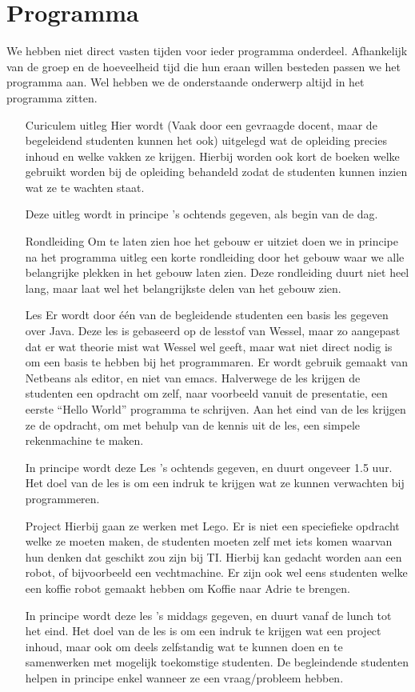 \documentclass[a4paper,11pt]{report}
\begin{document}
\chapter{Programma}
We hebben niet direct vasten tijden voor ieder programma onderdeel. Afhankelijk van de groep en de hoeveelheid tijd die hun eraan willen besteden passen we het programma aan. Wel hebben we de onderstaande onderwerp altijd in het programma zitten.
\begin{itemize}
  \item[Curiculem uitleg] Hier wordt (Vaak door een gevraagde docent, maar de begeleidend studenten kunnen het ook) uitgelegd wat de opleiding precies inhoud en welke vakken ze krijgen. Hierbij worden ook kort de boeken welke gebruikt worden bij de opleiding behandeld zodat de studenten kunnen inzien wat ze te wachten staat. 

    Deze uitleg wordt in principe 's ochtends gegeven, als begin van de dag. 
  \item[Rondleiding] Om te laten zien hoe het gebouw er uitziet doen we in principe na het programma uitleg een korte rondleiding door het gebouw waar we alle belangrijke plekken in het gebouw laten zien. Deze rondleiding duurt niet heel lang, maar laat wel het belangrijkste delen van het gebouw zien.
  \item[Les] Er wordt door \'{e}\'{e}n van de begleidende studenten een basis les gegeven over Java. Deze les is gebaseerd op de lesstof van Wessel, maar zo aangepast dat er wat theorie mist wat Wessel wel geeft, maar wat niet direct nodig is om een basis te hebben bij het programmaren. Er wordt gebruik gemaakt van Netbeans als editor, en niet van emacs. Halverwege de les krijgen de studenten een opdracht om zelf, naar voorbeeld vanuit de presentatie, een eerste ``Hello World'' programma te schrijven. Aan het eind van de les krijgen ze de opdracht, om met behulp van de kennis uit de les, een simpele rekenmachine te maken. 

    In principe wordt deze Les 's ochtends gegeven, en duurt ongeveer 1.5 uur. Het doel van de les is om een indruk te krijgen wat ze kunnen verwachten bij programmeren.
  \item[Project] Hierbij gaan ze werken met Lego. Er is niet een speciefieke opdracht welke ze moeten maken, de studenten moeten zelf met iets komen waarvan hun denken dat geschikt zou zijn bij TI. Hierbij kan gedacht worden aan een robot, of bijvoorbeeld een vechtmachine. Er zijn ook wel eens studenten welke een koffie robot gemaakt hebben om Koffie naar Adrie te brengen. 

    In principe wordt deze les 's middags gegeven, en duurt vanaf de lunch tot het eind. Het doel van de les is om een indruk te krijgen wat een project inhoud, maar ook om deels zelfstandig wat te kunnen doen en te samenwerken met mogelijk toekomstige studenten. De begleindende studenten helpen in principe enkel wanneer ze een vraag/probleem hebben. 
\end{itemize}

\end{document}
